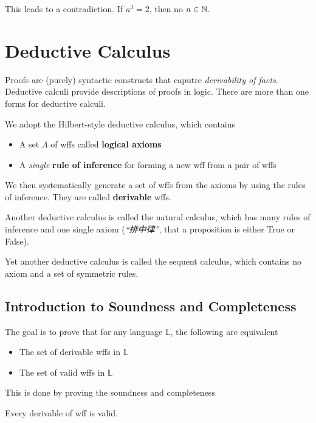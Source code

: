 This leads to a contradiction. If $a^3 = 2$, then no $a \in \mathbb{N}$.

\section{Deductive Calculus}

Proofs are (purely) syntactic constructs that caputre \emph{derivability of facts}. Deductive calculi provide descriptions of proofs in logic. There are more than one forms for deductive calculi.

We adopt the Hilbert-style deductive calculus, which contains

\begin{itemize}
    \item A set $\Lambda$ of wffs called \textbf{logical axioms}
    \item A \emph{single} \textbf{rule of inference} for forming a new wff from a pair of wffs
\end{itemize}

We then systematically generate a set of wffs from the axioms by using the rules of inference. They are called \textbf{derivable} wffs.

Another deductive calculus is called the natural calculus, which has many rules of inference and one single axiom (\emph{“排中律”}, that a proposition is either True or False).

Yet another deductive calculus is called the sequent calculus, which contains no axiom and a set of symmetric rules.

\subsection{Introduction to Soundness and Completeness}

The goal is to prove that for any language $\mathbb{L}$, the following are equivalent

\begin{itemize}
    \item The set of derivable wffs in $\mathbb{L}$
    \item The set of valid wffs in $\mathbb{L}$
\end{itemize}

This is done by proving the soundness and completeness

\begin{theorem}[Soundness]
    \label{thm:FOSoundness}
    Every derivable of wff is valid.
\end{theorem}

